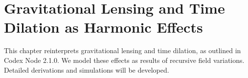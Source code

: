 \section{Gravitational Lensing and Time Dilation as Harmonic Effects}
This chapter reinterprets gravitational lensing and time dilation, as outlined in Codex Node 2.1.0. We model these effects as results of recursive field variations. Detailed derivations and simulations will be developed.